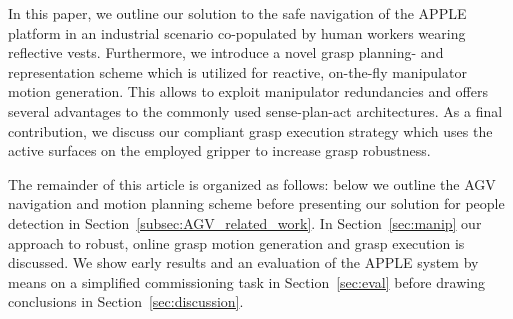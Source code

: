 In this paper, we outline our solution to the safe navigation of the APPLE platform in an industrial
scenario co-populated by human workers wearing reflective vests. Furthermore, we introduce a novel
grasp planning- and representation scheme which is utilized for reactive, on-the-fly manipulator
motion generation. This allows to exploit manipulator redundancies and offers several advantages to
the commonly used sense-plan-act architectures. As a final contribution, we discuss our compliant
grasp execution strategy which uses the active surfaces on the employed gripper to increase grasp robustness.

The remainder of this article is organized as follows: below we outline the AGV navigation and
motion planning scheme before presenting our solution for people detection in
Section~\ref{subsec:AGV_related_work}. In Section~\ref{sec:manip} our approach to robust, online
grasp motion generation and grasp execution is discussed. We show early results and an evaluation of
the APPLE system by means on a simplified commissioning task in Section~\ref{sec:eval} before
drawing conclusions in Section~\ref{sec:discussion}.
